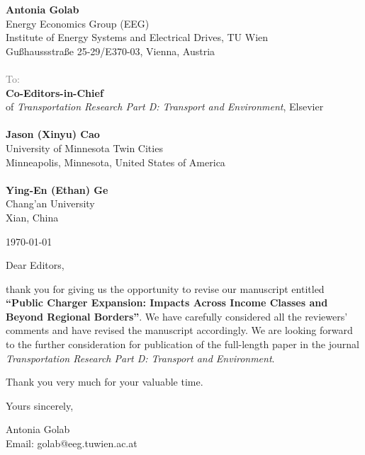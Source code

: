 \documentclass[10.5pt]{letter}
\begin{document}
\begin{letter}{}

\textbf{Antonia Golab} \\
\footnotesize{
Energy Economics Group (EEG) \\
Institute of Energy Systems and Electrical Drives, TU Wien\\
Gußhaussstraße 25-29/E370-03, Vienna, Austria} \\
\\
\normalsize
\textcolor{gray}{To:}\\ 
\textbf{Co-Editors-in-Chief}\\
of \textit{Transportation Research Part D: Transport and Environment}, Elsevier \\\\ 
\textbf{Jason (Xinyu) Cao} \\
\footnotesize{University of Minnesota Twin Cities \\
Minneapolis, Minnesota, United States of America}\\\\
\normalsize\textbf{Ying-En (Ethan) Ge}\\
\footnotesize{Chang'an University\\ 
Xian, China}\\ 
\normalsize

\begin{flushright}
\today
\end{flushright}

Dear Editors,

thank you for giving us the opportunity to revise our manuscript entitled \textbf{``Public Charger Expansion: Impacts Across Income Classes and Beyond Regional Borders''}.  
We have carefully considered all the reviewers' comments and have revised the manuscript accordingly. 
We are looking forward to the further consideration for publication of the full-length paper in the journal \textit{Transportation Research Part D: Transport and Environment}. 

Thank you very much for your valuable time.

\closing{Yours sincerely,}

\vspace{0.5cm}

Antonia Golab\\
Email: golab@eeg.tuwien.ac.at \\

\end{letter}
\end{document}
